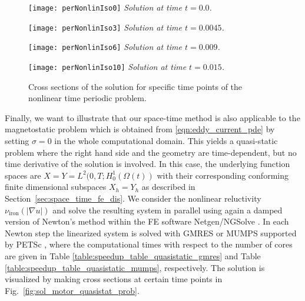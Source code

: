 \documentclass[12pt]{article}
\numberwithin{equation}{section}
\begin{document}
\begin{figure}[tbhp]
\begin{minipage}{0.47\linewidth}
\begin{center}
\texttt{[image: perNonlinIso0]}
\textit{Solution at time $t = 0.0$.}
\end{center} 
\end{minipage}
\hfill
\vspace{0.2 cm}
\begin{minipage}{0.47\linewidth}
\begin{center}
\texttt{[image: perNonlinIso3]} 
\textit{Solution at time $t = 0.0045$.}
\end{center}
\end{minipage}
\vfill
\vspace{0.2 cm}
\begin{minipage}{0.47\linewidth}
\begin{center}
\texttt{[image: perNonlinIso6]} 
\textit{Solution at time $t = 0.009$.}
\end{center}
\end{minipage}
\hfill
\begin{minipage}{0.47\linewidth}
\begin{center}
\texttt{[image: perNonlinIso10]}
\textit{Solution at time $t = 0.015$.}
\end{center}
\end{minipage}
\caption{Cross sections of the solution for specific time points of the nonlinear time periodic problem.}
\label{fig:sol_motor_periodic_conditions}
\end{figure}

Finally, we want to illustrate that our space-time method is also applicable to the magnetostatic problem which is obtained from \eqref{eqn:eddy_current_pde} by setting $\sigma = 0$ in the whole computational
domain. This yields a quasi-static problem where the right hand side and the geometry are time-dependent, but no time derivative of the solution is involved.
In this case, the underlying function spaces are
$X = Y = L^2(0,T;H^1_0(\Omega(t))$ 
with their corresponding conforming finite dimensional subspaces
$X_h = Y_h$ as described in Section~\ref{sec:space_time_fe_dis}.
We consider the nonlinear reluctivity $\nu_{\text{iron}}(|\nabla u|)$ and
 solve the resulting system in parallel
using again a damped version of Newton's method within the FE software Netgen/NGSolve \cite{netgen}.
In each Newton step the linearized system is solved with GMRES or MUMPS 
supported by PETSc \cite{DaPaKlCo2011}, where the computational times 
with respect to the number of cores are given in Table 
\ref{table:speedup_table_quasistatic_gmres} and Table 
\ref{table:speedup_table_quasistatic_mumps}, respectively. The solution is 
visualized by making cross sections at certain time points in Fig.~\ref{fig:sol_motor_quasistat_prob}.
\end{document}
